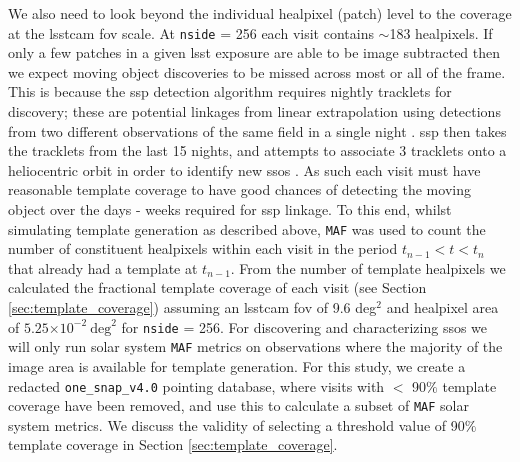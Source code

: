 \documentclass[preprintm,linenumbers]{aastex631}
\newcommand{\baseline}{\texttt{one\_snap\_v4.0}\xspace}
\newcommand{\maf}{\texttt{MAF}\xspace}
\providecommand{\e}[1]{\ensuremath{\times 10^{#1}}}
\begin{document}
		
		We also need to look beyond the individual healpixel (patch) level to the coverage at the \gls*{lsstcam} \gls*{fov} scale. 
  At \texttt{nside} = 256 each visit contains $\sim$183 healpixels.
  If only a few patches in a given \gls*{lsst} exposure are able to be image subtracted then we expect moving object discoveries to be missed across most or all of the frame. 
  This is because the \gls*{ssp} detection algorithm requires nightly tracklets for  discovery; these are potential linkages from linear extrapolation using detections from two different observations of the same field in a single night \citep{lsstMOPS,lsstSSP}.  
  \gls*{ssp} then takes the tracklets from the last 15 nights, and attempts to associate 3 tracklets onto a heliocentric orbit in order to identify new \glspl*{sso} \citep{kubica2007,lsstMOPS,lsstSSP}. 
  As such each visit must have reasonable template coverage to have good chances of detecting the moving object over the days - weeks required for \gls*{ssp} linkage.
  To this end, whilst simulating template generation as described above, \maf was used to count the number of constituent healpixels within each visit in the period $t_{n-1} < t < t_n$ that already had a template at $t_{n-1}$.
  From the number of template healpixels we calculated the fractional template coverage of each visit (see Section \ref{sec:template_coverage}) assuming an \gls*{lsstcam} \gls*{fov} of 9.6 deg$^2$ and healpixel area of $5.25\e{-2}\ \mathrm{deg}^2$ for \texttt{nside} = 256.
  For discovering and characterizing \glspl*{sso} we will only run solar system \maf metrics on observations where the majority of the image area is available for template generation. For this study, we create a redacted  \baseline pointing database, where visits with $<$ 90$\%$ template coverage have been removed, and use this to calculate a subset of \maf solar system metrics.  We discuss the validity of selecting a threshold value of 90$\%$  template coverage in Section \ref{sec:template_coverage}.
  
\end{document}
